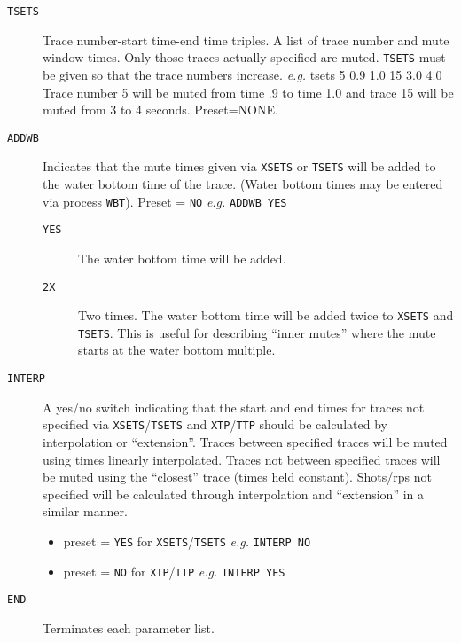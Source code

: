 \begin{description}
\item[\texttt{TSETS}] Trace number-start time-end time triples.  A list of trace
         number and mute window times.  Only those traces actually
         specified are muted.  \texttt{TSETS} must be given so that the trace
         numbers increase.  \textit{e.g.}  tsets 5 0.9 1.0 15 3.0 4.0
         Trace number 5 will be muted from time .9 to time 1.0 and trace
         15 will be muted from 3 to 4 seconds.
         Preset=NONE.

\item[\texttt{ADDWB}] Indicates that the mute times given via \texttt{XSETS} or \texttt{TSETS} will be
         added to the water bottom time of the trace. (Water bottom
         times may be entered via process \texttt{WBT}).
         Preset = \texttt{NO}     \textit{e.g.}  \texttt{ADDWB YES}
\begin{description}
\item[\texttt{YES}]  The water bottom time will be added.
\item[\texttt{2X}]  Two times.  The water bottom time will be added twice to
         \texttt{XSETS} and \texttt{TSETS}.  This is useful for describing ``inner mutes''
         where the mute starts at the water bottom multiple.
\end{description}

\item[\texttt{INTERP}] A yes/no switch indicating that the start and end
         times for traces not specified via \texttt{XSETS}/\texttt{TSETS} and \texttt{XTP}/\texttt{TTP}
         should be calculated by interpolation or ``extension''.  Traces
         between specified traces will be muted using times linearly
         interpolated.  Traces not between specified traces will be muted
         using the ``closest'' trace (times held constant).  Shots/\glspl{rp} not
         specified will be calculated through interpolation and
         ``extension'' in a similar manner.
\begin{itemize}
\item \Gls{preset} = \texttt{YES} for \texttt{XSETS}/\texttt{TSETS}   \textit{e.g.}   \texttt{INTERP NO}
\item \Gls{preset} = \texttt{NO} for \texttt{XTP}/\texttt{TTP}       \textit{e.g.}    \texttt{INTERP YES}
\end{itemize}

\item[\texttt{END}] Terminates each parameter list.
\end{description}

